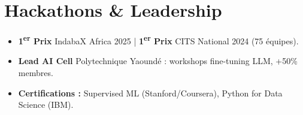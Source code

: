\documentclass[a4paper,11pt]{article}
\begin{document}
\begin{itemize}[leftmargin=*, label={-}]
\end{itemize}

\section{Hackathons \& Leadership}
\begin{itemize}[leftmargin=*, label=\tiny$\bullet$, nosep]
    \item \small{\textbf{1\textsuperscript{er} Prix} IndabaX Africa 2025 | \textbf{1\textsuperscript{er} Prix} CITS National 2024 (75 équipes).}
    \item \small{\textbf{Lead AI Cell} Polytechnique Yaoundé : workshops fine-tuning LLM, +50\% membres.}
    \item \small{\textbf{Certifications :} Supervised ML (Stanford/Coursera), Python for Data Science (IBM).}
\end{itemize}
\end{document}

